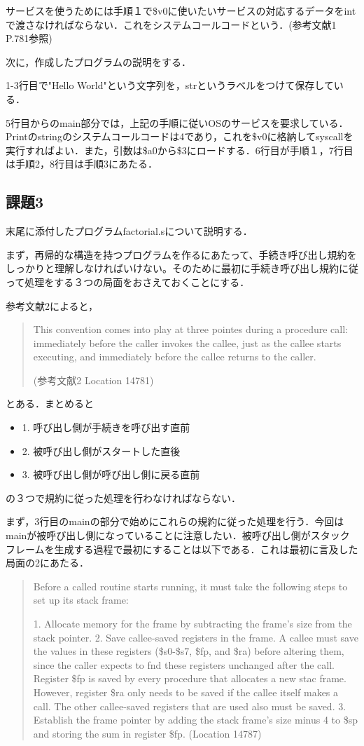 \documentclass[a4j]{jarticle}
\begin{document}
サービスを使うためには手順１で\$v0に使いたいサービスの対応するデータをintで渡さなければならない．これをシステムコールコードという．(参考文献1 P.781参照)

次に，作成したプログラムの説明をする．

1-3行目で"Hello World"という文字列を，strというラベルをつけて保存している．

5行目からのmain部分では，上記の手順に従いOSのサービスを要求している．Printのstringのシステムコールコードは4であり，これを\$v0に格納してsyscallを実行すればよい．また，引数は\$a0から\$3にロードする．6行目が手順１，7行目は手順2，8行目は手順3にあたる．


\subsection{課題3}

末尾に添付したプログラムfactorial.sについて説明する．

まず，再帰的な構造を持つプログラムを作るにあたって、手続き呼び出し規約をしっかりと理解しなければいけない。そのために最初に手続き呼び出し規約に従って処理をする３つの局面をおさえておくことにする．

参考文献2によると，

\begin{quote}
This convention comes into play at three pointes during a procedure call: immediately before the caller invokes the callee, just as the callee starts executing, and immediately before the callee returns to the caller.

(参考文献2 Location 14781)
\end{quote}

とある．まとめると

\begin{itemize}
\item1. 呼び出し側が手続きを呼び出す直前
\item2. 被呼び出し側がスタートした直後
\item3. 被呼び出し側が呼び出し側に戻る直前
\end{itemize}

の３つで規約に従った処理を行わなければならない．

まず，3行目のmainの部分で始めにこれらの規約に従った処理を行う．今回はmainが被呼び出し側になっていることに注意したい．被呼び出し側がスタックフレームを生成する過程で最初にすることは以下である．これは最初に言及した局面の2にあたる．

\begin{quote}
Before a called routine starts running, it must take the following steps to set up its stack frame:

1. Allocate memory for the frame by subtracting the frame's size from the stack pointer.
2. Save callee-saved registers in the frame. A callee must save the values in these registers (\$s0-\$s7, \$fp, and \$ra) before altering them, since the caller expects to fnd these registers unchanged after the call. Register \$fp is saved by every procedure that allocates a new stac frame. However, register \$ra only needs to be saved if the callee itself makes a call. The other callee-saved registers that are used also must be saved.
3. Establish the frame pointer by adding the stack frame's size minus 4 to \$sp and storing the sum in register \$fp.
(Location 14787)
\end{quote}
\end{document}
